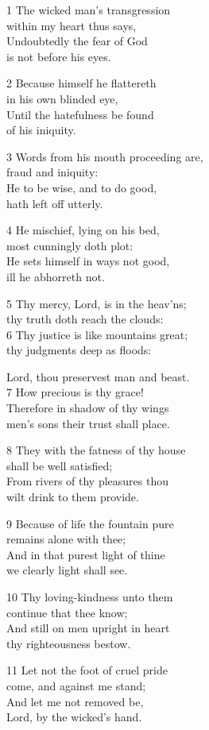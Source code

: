 1 The wicked man’s transgression\\
within my heart thus says,\\
Undoubtedly the fear of God\\
is not before his eyes.

2 Because himself he flattereth\\
in his own blinded eye,\\
Until the hatefulness be found\\
of his iniquity.

3 Words from his mouth proceeding are,\\
fraud and iniquity:\\
He to be wise, and to do good,\\
hath left off utterly.

4 He mischief, lying on his bed,\\
most cunningly doth plot:\\
He sets himself in ways not good,\\
ill he abhorreth not.

5 Thy mercy, Lord, is in the heav’ns;\\
thy truth doth reach the clouds:\\
6 Thy justice is like mountains great;\\
thy judgments deep as floods:

Lord, thou preservest man and beast.\\
7 How precious is thy grace!\\
Therefore in shadow of thy wings\\
men’s sons their trust shall place.

8 They with the fatness of thy house\\
shall be well satisfied;\\
From rivers of thy pleasures thou\\
wilt drink to them provide.

9 Because of life the fountain pure\\
remains alone with thee;\\
And in that purest light of thine\\
we clearly light shall see.

10 Thy loving-kindness unto them\\
continue that thee know;\\
And still on men upright in heart\\
thy righteousness bestow.

11 Let not the foot of cruel pride\\
come, and against me stand;\\
And let me not removed be,\\
Lord, by the wicked’s hand.

